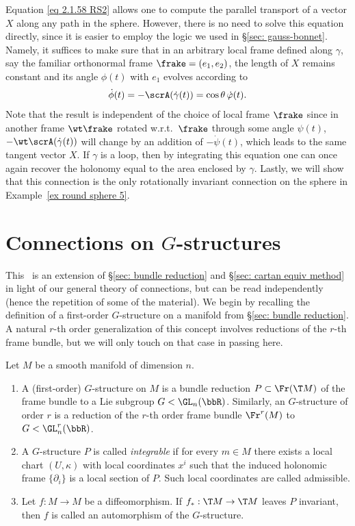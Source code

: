 \begin{example}
    Equation \eqref{eq 2.1.58 RS2} allows one to compute the parallel transport of a vector $X$ along any path in the sphere. However, there is no need to solve this equation directly, since it is easier to employ the logic we used in \S\ref{sec: gauss-bonnet}. Namely, it suffices to make sure that in an arbitrary local frame defined along $\gamma$, say the familiar orthonormal frame $\frake=(e_1,e_2)$, the length of $X$ remains constant and its angle $\phi(t)$ with $e_1$ evolves according to 
    \[\dot\phi(t)=-\scrA(\dot\gamma(t))=\cos\theta \,\dot\varphi(t).\]
    Note that the result is independent of the choice of local frame $\frake$ since in another frame $\wt\frake$ rotated w.r.t.\ $\frake$ through some angle $\psi(t)$, $-\wt\scrA(\dot\gamma(t))$ will change by an addition of $-\dot\psi(t)$, which leads to the same tangent vector $X$. If $\gamma$ is a loop, then by integrating this equation one can once again recover the holonomy equal to the area enclosed by $\gamma$.
    Lastly, we will show that this connection is the only rotationally invariant connection on the sphere in Example~\ref{ex round sphere 5}.
\end{example}





\section{Connections on \texorpdfstring{$G$}{G}-structures}\label{sec: connections on G-structures}

This \sect\ is an extension of \S\ref{sec: bundle reduction} and \S\ref{sec: cartan equiv method} in light of our general theory of connections, but can be read independently (hence the repetition of some of the material). We begin by recalling the definition of a first-order $G$-structure on a manifold from \S\ref{sec: bundle reduction}. A natural $r$-th order generalization of this concept involves reductions of the $r$-th frame bundle, but we will only touch on that case in passing here.

\begin{defn}
    Let $M$ be a smooth manifold of dimension $n$.
    \begin{enumerate}
        \item A (first-order) $G$-structure on $M$ is a bundle reduction $P\subset \Fr(\T M)$ of the frame bundle to a Lie subgroup $G< \GL_n(\bbR)$. Similarly, an $G$-structure of order $r$ is a reduction of the $r$-th order frame bundle $\Fr^r(M)$ to $G<\GL_n^r(\bbR)$.
        \item A $G$-structure $P$ is called \emph{integrable} if for every $m\in M$ there exists a local chart $(U,\kappa)$ with local coordinates $x^i$ such that the induced holonomic frame $\{\partial_i\}$ is a local section of $P$. Such local coordinates are called admissible.
        \item Let $f:M\to M$ be a diffeomorphism. If $f_\ast:\T M\to \T M$ leaves $P$ invariant, then $f$ is called an automorphism of the $G$-structure.
    \end{enumerate}
\end{defn}

